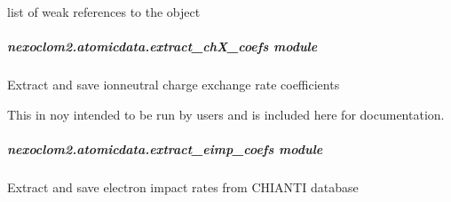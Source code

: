 \documentclass[letterpaper,10pt,english]{sphinxmanual}
\begin{document}
\begin{fulllineitems}

\begin{fulllineitems}
\label{\detokenize{nexoclom2/nexoclom2.atomicdata.eimp_ionization_coef:nexoclom2.atomicdata.eimp_ionization_coef.EimpIonizationCoef.__weakref__}}
\pysigstartsignatures
\pysigline
{}
\pysigstopsignatures
\sphinxAtStartPar
list of weak references to the object

\end{fulllineitems}


\end{fulllineitems}


\sphinxstepscope


\subparagraph{nexoclom2.atomicdata.extract\_chX\_coefs module}
\label{\detokenize{nexoclom2/nexoclom2.atomicdata.extract_chX_coefs:module-nexoclom2.atomicdata.extract_chX_coefs}}\label{\detokenize{nexoclom2/nexoclom2.atomicdata.extract_chX_coefs:nexoclom2-atomicdata-extract-chx-coefs-module}}\label{\detokenize{nexoclom2/nexoclom2.atomicdata.extract_chX_coefs::doc}}
\sphinxAtStartPar
Extract and save ion\sphinxhyphen{}neutral charge exchange rate coefficients

\sphinxAtStartPar
This in noy intended to be run by users and is included here for documentation.

\sphinxstepscope


\subparagraph{nexoclom2.atomicdata.extract\_eimp\_coefs module}
\label{\detokenize{nexoclom2/nexoclom2.atomicdata.extract_eimp_coefs:module-nexoclom2.atomicdata.extract_eimp_coefs}}\label{\detokenize{nexoclom2/nexoclom2.atomicdata.extract_eimp_coefs:nexoclom2-atomicdata-extract-eimp-coefs-module}}\label{\detokenize{nexoclom2/nexoclom2.atomicdata.extract_eimp_coefs::doc}}
\sphinxAtStartPar
Extract and save electron impact rates from CHIANTI database
\end{document}
